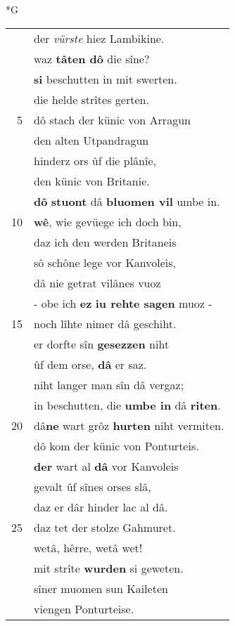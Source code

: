 \documentclass[8pt,a4paper,notitlepage]{article}
\begin{document}
\newpage
\begin{table}[ht]
\begin{minipage}[t]{0.5\linewidth}
\small
\begin{center}*G
\end{center}
\begin{tabular}{rl}
 & der \textit{vürste} hiez Lambikine.\\ 
 & waz \textbf{tâten dô} die sîne?\\ 
 & \textbf{si} beschutten in mit swerten.\\ 
 & die helde strîtes gerten.\\ 
5 & dô stach der künic von Arragun\\ 
 & den alten Utpandragun\\ 
 & hinderz ors ûf die plânîe,\\ 
 & den künic von Britanie.\\ 
 & \textbf{dô} \textbf{stuont} dâ \textbf{bluomen vil} umbe in.\\ 
10 & \textbf{wê}, wie gevüege ich doch bin,\\ 
 & daz ich den werden Britaneis\\ 
 & sô schône lege vor Kanvoleis,\\ 
 & dâ nie getrat vilânes vuoz\\ 
 & - obe ich \textbf{ez} \textbf{iu rehte sagen} muoz -\\ 
15 & noch lîhte nimer dâ geschiht.\\ 
 & er dorfte sîn \textbf{gesezzen} niht\\ 
 & ûf dem orse, \textbf{dâ} er saz.\\ 
 & niht langer man sîn dâ vergaz;\\ 
 & in beschutten, die \textbf{umbe in} dâ \textbf{riten}.\\ 
20 & dâ\textbf{ne} wart grôz \textbf{hurten} niht vermiten.\\ 
 & dô kom der künic von Ponturteis.\\ 
 & \textbf{der} wart al \textbf{dâ} vor Kanvoleis\\ 
 & gevalt ûf sînes orses slâ,\\ 
 & daz er dâr hinder lac al dâ.\\ 
25 & daz tet der stolze Gahmuret.\\ 
 & wetâ, hêrre, wetâ wet!\\ 
 & mit strîte \textbf{wurden} si geweten.\\ 
 & sîner muomen sun Kaileten\\ 
 & viengen Ponturteise.\\ 

\end{tabular}
\end{minipage}
\end{table}
\end{document}
